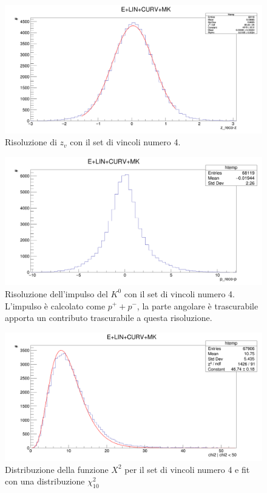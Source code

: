 \documentclass[8pt]{extarticle}
\begin{document}
\begin{figure}
	\begin{center}
		\includegraphics[scale=0.25]{set_4_z} 
		\caption{Risoluzione di $z_v$ con il set di vincoli numero 4.}
		\label{fig:set_4_z}
	\end{center}
\end{figure}

\begin{figure}
	\begin{center}
		\includegraphics[scale=0.25]{set_4_p} 
		\caption{Risoluzione dell'impulso del $K^0$ con il set di vincoli numero 4. L'impulso è calcolato come $p^+ + p^-$, la parte angolare è trascurabile apporta un contributo trascurabile a questa risoluzione.}
		\label{fig:set_4_p}
	\end{center}
\end{figure}

\begin{figure}
	\begin{center}
		\includegraphics[scale=0.25]{set_4_chi2} 
		\caption{Distribuzione della funzione $X^2$ per il set di vincoli numero 4 e fit con una distribuzione $\chi^2_{10}$}
		\label{fig:set_4_chi2}
	\end{center}
\end{figure}
\end{document}
